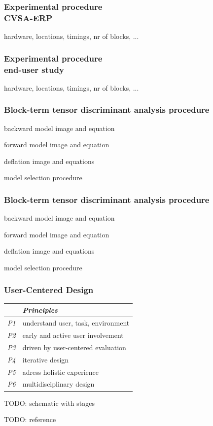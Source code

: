 \documentclass{kul-ulille-beamer}
\begin{document}
\begin{frame}
  \frametitle{Experimental procedure \\ CVSA-ERP}
  hardware, locations, timings, nr of blocks, ...
\end{frame}
\begin{frame}
  \frametitle{Experimental procedure \\ end-user study}
  hardware, locations, timings, nr of blocks, ...
\end{frame}

\begin{frame}
  \frametitle{Block-term tensor discriminant analysis procedure}
  backward model image and equation

  forward model image and equation

  deflation image and equations

  model selection procedure
\end{frame}

\begin{frame}
  \frametitle{Block-term tensor discriminant analysis procedure}
  backward model image and equation

  forward model image and equation

  deflation image and equations

  model selection procedure
\end{frame}



\begin{frame}[c]
\frametitle{User-Centered Design}

  \begin{minipage}[c]{.5\textwidth}
  \begin{tabular}{|l|l|}
    \hline
     & \emph{Principles} \\ \hline
     \emph{P1} & understand user, task, environment \\
     \emph{P2} & early and active user involvement \\
     \emph{P3} & driven by user-centered evaluation \\
     \emph{P4} & iterative design \\
     \emph{P5} & adress holistic experience \\
     \emph{P6} & multidisciplinary design \\
    \hline
  \end{tabular}
  \end{minipage}\hfill%
  \begin{minipage}[c]{.4\textwidth}
      TODO: schematic with stages

      TODO: reference
  \end{minipage}

\end{frame}
\end{document}
